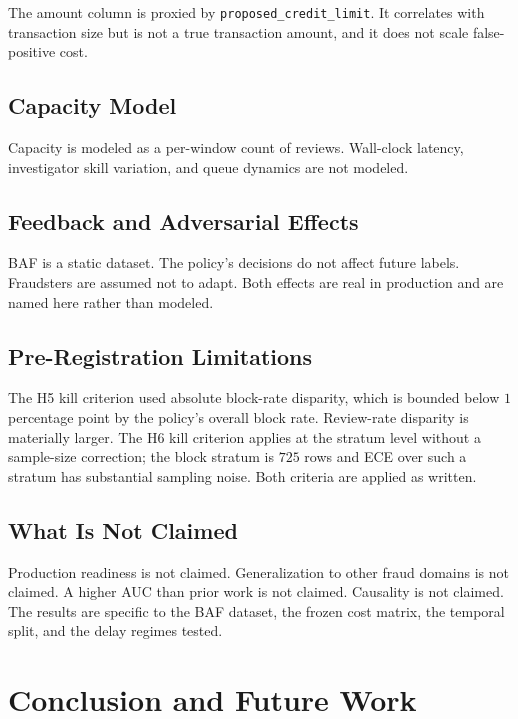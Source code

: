 \documentclass[conference]{IEEEtran}
\begin{document}
The amount column is proxied by \texttt{proposed\_credit\_limit}. It
correlates with transaction size but is not a true transaction amount, and
it does not scale false-positive cost.

\subsection{Capacity Model}

Capacity is modeled as a per-window count of reviews. Wall-clock latency,
investigator skill variation, and queue dynamics are not modeled.

\subsection{Feedback and Adversarial Effects}

BAF is a static dataset. The policy's decisions do not affect future
labels. Fraudsters are assumed not to adapt. Both effects are real in
production and are named here rather than modeled.

\subsection{Pre-Registration Limitations}

The H5 kill criterion used absolute block-rate disparity, which is bounded
below $1$ percentage point by the policy's overall block rate. Review-rate
disparity is materially larger. The H6 kill criterion applies at the
stratum level without a sample-size correction; the block stratum is $725$
rows and ECE over such a stratum has substantial sampling noise. Both
criteria are applied as written.

\subsection{What Is Not Claimed}

Production readiness is not claimed. Generalization to other fraud domains
is not claimed. A higher AUC than prior work is not claimed. Causality is
not claimed. The results are specific to the BAF dataset, the frozen cost
matrix, the temporal split, and the delay regimes tested.

\section{Conclusion and Future Work}
\label{sec:conclusion}
\end{document}
